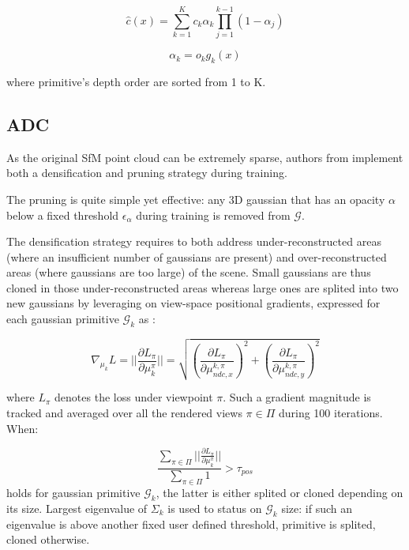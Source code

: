 \begin{equation}
\label{eq:gs-alpha-blending}
  \hat{c}(x) = \sum_{k=1}^{K}c_{k}\alpha_{k}\prod_{j=1}^{k-1}(1-\alpha_{j})
\end{equation}

\begin{equation}
\label{eq:gs-alpha-def}
  \alpha_{k} = o_{k}g_{k}(x)
\end{equation}

where primitive’s depth order are sorted from 1 to K. \newline

\subsection{ADC} 
As the original SfM point cloud can be extremely sparse, authors from \citep{kerbl20233d} implement both a densification and pruning strategy during training. 

The pruning is quite simple yet effective: any 3D gaussian that has an opacity $\alpha$ below a fixed threshold $\epsilon_{\alpha}$ during training is removed from $\mathcal{G}$. 

The densification strategy requires to both address under-reconstructed areas (where an insufficient number of gaussians are present) and over-reconstructed areas (where gaussians are too large) of the scene. Small gaussians are thus cloned in those under-reconstructed areas whereas large ones are splited into two new gaussians by leveraging on view-space positional gradients, expressed for each gaussian primitive $\mathcal{G}_{k}$ as : 

\begin{equation}
   \nabla_{\mu_{k}}L= ||\frac{\partial L_{\pi}}{\partial \mu_{k}^{\pi}}|| = \sqrt{\left(\frac{\partial L_{\pi}}{\partial \mu_{ndc,x}^{k,\pi}}\right)^{2} + \left(\frac{\partial L_{\pi}}{\partial \mu_{ndc,y}^{k,\pi}}\right)^{2}}
\end{equation}

where $L_{\pi}$ denotes the loss under viewpoint $\pi$. Such a gradient magnitude is tracked and averaged over all the rendered views $\pi \in \Pi$ during 100 iterations. When: 

\begin{equation}
\frac{\sum \limits_{\pi \in \Pi} ||\frac{\partial L_{\pi}}{\partial \mu_{k}^{\pi}}||}{\sum \limits_{\pi \in \Pi} 1} > \tau_{pos}
\label{eq:adc-original}
\end{equation}
holds for gaussian primitive $\mathcal{G}_{k}$, the latter is either splited or cloned depending on its size. Largest eigenvalue of $\Sigma_{k}$ is used to status on $\mathcal{G}_{k}$ size: if such an eigenvalue is above another fixed user defined threshold, primitive is splited, cloned otherwise. \newline

